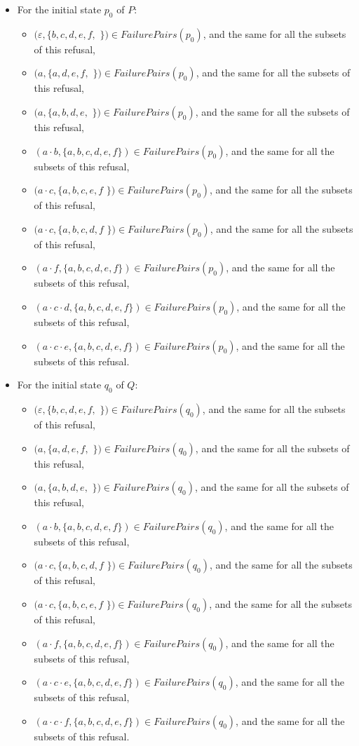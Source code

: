 \documentclass[11pt]{article}
\theoremstyle{definition}
\newcommand{\cmark}{\ding{51}}
\theoremstyle{plain}
\theoremstyle{definition}
\begin{document}
\begin{itemize}
	\item For the initial state $ p_0 $ of $ P $:
	\begin{itemize}
		\item $(\varepsilon, \{b, c, d, e, f, $ \cmark $\}) \in FailurePairs(p_0)$, and the same for all the subsets of this refusal,
		\item $(a, \{a, d, e, f, $ \cmark $\}) \in FailurePairs(p_0)$, and the same for all the subsets of this refusal,
		\item $(a, \{a, b, d, e, $ \cmark $\}) \in FailurePairs(p_0)$, and the same for all the subsets of this refusal,
		\item $(a·b, \{a, b, c, d, e, f\}) \in FailurePairs(p_0)$, and the same for all the subsets of this refusal,
		\item $(a·c, \{a, b, c, e, f$ \cmark $\}) \in FailurePairs(p_0)$, and the same for all the subsets of this refusal,
		\item $(a·c, \{a, b, c, d, f$ \cmark $\}) \in FailurePairs(p_0)$, and the same for all the subsets of this refusal,
		\item $(a·f, \{a, b, c, d, e, f\}) \in FailurePairs(p_0)$, and the same for all the subsets of this refusal,
		\item $(a·c·d, \{a, b, c, d, e, f\}) \in FailurePairs(p_0)$, and the same for all the subsets of this refusal,
		\item $(a·c·e, \{a, b, c, d, e, f\}) \in FailurePairs(p_0)$, and the same for all the subsets of this refusal.
	\end{itemize}
	\item For the initial state $ q_0 $ of $ Q $:
	\begin{itemize}
		\item $(\varepsilon, \{b, c, d, e, f, $ \cmark $\}) \in FailurePairs(q_0)$, and the same for all the subsets of this refusal,
		\item $(a, \{a, d, e, f, $ \cmark $\}) \in FailurePairs(q_0)$, and the same for all the subsets of this refusal,
		\item $(a, \{a, b, d, e, $ \cmark $\}) \in FailurePairs(q_0)$, and the same for all the subsets of this refusal,
		\item $(a·b, \{a, b, c, d, e, f\}) \in FailurePairs(q_0)$, and the same for all the subsets of this refusal,
		\item $(a·c, \{a, b, c, d, f$ \cmark $\}) \in FailurePairs(q_0)$, and the same for all the subsets of this refusal,
		\item $(a·c, \{a, b, c, e, f$ \cmark $\}) \in FailurePairs(q_0)$, and the same for all the subsets of this refusal,
		\item $(a·f, \{a, b, c, d, e, f\}) \in FailurePairs(q_0)$, and the same for all the subsets of this refusal,
		\item $(a·c·e, \{a, b, c, d, e, f\}) \in FailurePairs(q_0)$, and the same for all the subsets of this refusal,
		\item $(a·c·f, \{a, b, c, d, e, f\}) \in FailurePairs(q_0)$, and the same for all the subsets of this refusal.
	\end{itemize}
\end{itemize}
\end{document}
